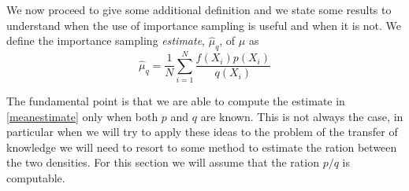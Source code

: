   \noindent We now proceed to give some additional definition and we state some results to understand when the use of importance sampling
  is useful and when it is not.\newline
  We define the importance sampling \textit{estimate}, $\hat{\mu}_q$, of $\mu$ as
  \begin{equation}
    \hat{\mu}_q = \frac{1}{N} \sum_{i=1}^{N} \frac{f(X_i)p(X_i)}{q(X_i)}
    \label{meanestimate}
  \end{equation}

  \noindent The fundamental point is that we are able to compute the estimate in \ref{meanestimate} only when both $p$ and $q$ are known.
  This is not always the case, in particular when we will try to apply these ideas to the problem of the transfer of knowledge
  we will need to resort to some method to estimate the ration between the two densities. For this section we will assume that
  the ration $p/q$ is computable.

